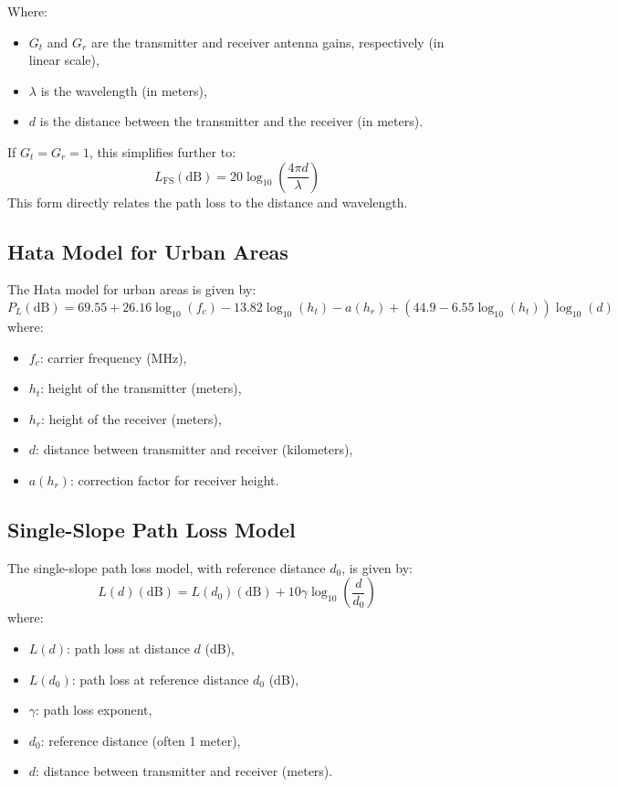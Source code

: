 \documentclass[a4paper,12pt]{book}
\begin{document}
	Where:
	\begin{itemize}
		\item \( G_t \) and \( G_r \) are the transmitter and receiver antenna gains, respectively (in linear scale),
		\item \( \lambda \) is the wavelength (in meters),
		\item \( d \) is the distance between the transmitter and the receiver (in meters).
	\end{itemize}
	
	If \(G_t = G_r = 1\), this simplifies further to:
	\[
	L_{\text{FS}} (\text{dB}) = 20 \log_{10} \left( \frac{4 \pi d}{\lambda} \right)
	\]
	This form directly relates the path loss to the distance and wavelength.
	
	\subsection{Hata Model for Urban Areas}
	The Hata model for urban areas is given by:
	\[
	P_L(\text{dB}) = 69.55 + 26.16 \log_{10}(f_c) - 13.82 \log_{10}(h_t) - a(h_r) + \left( 44.9 - 6.55 \log_{10}(h_t) \right) \log_{10}(d)
	\]
	where:
	\begin{itemize}
		\item \( f_c \): carrier frequency (MHz),
		\item \( h_t \): height of the transmitter (meters),
		\item \( h_r \): height of the receiver (meters),
		\item \( d \): distance between transmitter and receiver (kilometers),
		\item \( a(h_r) \): correction factor for receiver height.
	\end{itemize}
	
	\subsection{Single-Slope Path Loss Model}
	The single-slope path loss model, with reference distance \(d_0\), is given by:
	\[
	L(d) (\text{dB}) = L(d_0) (\text{dB}) + 10 \gamma \log_{10} \left( \frac{d}{d_0} \right)
	\]
	where:
	\begin{itemize}
		\item \( L(d) \): path loss at distance \( d \) (dB),
		\item \( L(d_0) \): path loss at reference distance \( d_0 \) (dB),
		\item \( \gamma \): path loss exponent,
		\item \( d_0 \): reference distance (often 1 meter),
		\item \( d \): distance between transmitter and receiver (meters).
	\end{itemize}
	
\end{document}
